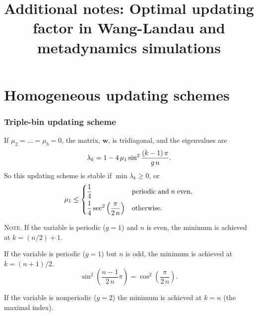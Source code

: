 \documentclass[reprint, floatfix]{revtex4-1}
\newcommand{\note}[1]{{\color{DarkGreen}\footnotesize \textsc{Note.} #1}}
\begin{document}
\title{Additional notes: Optimal updating factor in Wang-Landau and metadynamics simulations}



\section{Homogeneous updating schemes}
\subsubsection{\label{sec:nnscheme}
Triple-bin updating scheme}



If $\mu_2 = \dots = \mu_b = 0$,
the matrix, $\mathbf w$, is tridiagonal,
and the eigenvalues are
\begin{equation}
  \lambda_k
  =
  1 -
  4 \, \mu_1 \sin^2
  \frac{ (k - 1) \, \pi }
       {       g \, n   }
  .
\notag
\end{equation}
%
So this updating scheme is stable if
$\min \lambda_k \ge 0$,
or
\begin{equation}
  \mu_1 \le
  \begin{dcases}
    \frac 1 4
    & \mathrm{periodic \; and \;} n \mathrm{ \; even,}
    \\
    \frac 1 4
    \sec^2
    \left( \frac{  \pi   }
                { 2 \, n }
    \right)
    & \mathrm{otherwise}.
  \end{dcases}
\notag
\end{equation}

\note{
If the variable is periodic ($g = 1$) and $n$ is even,
the minimum is achieved at $k = (n/2) + 1$.

If the variable is periodic ($g = 1$) but $n$ is odd,
the minimum is achieved at $k = (n+1)/2$.
$$
\sin^2\left(
  \frac{n-1}{2 \, n} \pi
\right)
=
\cos^2\left(
  \frac{\pi}{2 \, n}
\right)
.
$$

If the variable is nonperiodic ($g = 2$)
the minimum is achieved at $k = n$ (the maximal index).
}
\end{document}
